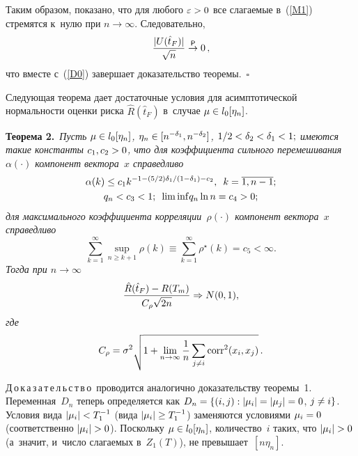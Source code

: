 \begin{multicols}{2}
Таким образом, показано, что для любого $\varepsilon>0$ все слагаемые в~(\ref{M1}) 
стремятся к~нулю при $n\to\infty$. Следовательно,
$$
\displaystyle\frac{\displaystyle |U(\hat{t}_F)|\mathstrut}{\displaystyle \sqrt{n}\mathstrut}  \overset{\, {\sf P} \, }{\to} 0 \,,
$$
что вместе с~(\ref{D0}) завершает доказательство тео\-ремы.~\hfill$\square$

\smallskip

Следующая теорема дает достаточные условия для асимптотической нормальности 
оценки риска $\hat{R}(\hat{t}_F)$ в~случае $\mu \hm\in l_0[\eta_n]$.

\smallskip

\noindent
\textbf{Теорема 2.}\ 
\textit{Пусть $\mu \hm\in l_0[\eta_n]$, $\eta_n\hm\in[n^{-\delta_1}, n^{-\delta_2}]$, $1/2\hm < 
\delta_2\hm < \delta_1\hm<1;$ имеются такие константы $c_1, c_2\hm>0$, что для 
коэффициента сильного перемешивания $\alpha(\cdot)$ компонент вектора~$x$ 
справедливо} 
\begin{gather*}
\alpha(k) \leq c_1 k^{-1-(5/2)\delta_1/(1\hm-\delta_1)\hm-c_2},\enskip 
k=\overline{1,n-1};\\
 q_n < c_3 < 1;\enskip \mathrm{lim\,inf} q_n \ln n = c_4 > 0;
\end{gather*}
\textit{для максимального коэффициента корреляции~$\rho(\cdot)$ компонент вектора~$x$ 
справедливо}
$$
\sum\limits_{k = 1}^{\infty} \sup\limits_{n\geq k+1} \rho(k) \equiv 
\sum\limits_{k = 1}^{\infty}  \rho^\star (k) = c_5 < \infty. 
$$
\textit{Тогда при $n \to \infty$}
$$
\displaystyle\frac{\displaystyle \hat{R}(\hat{t}_F) - R(T_m)\mathstrut}{\displaystyle C_\rho \sqrt{2n}\mathstrut} \Rightarrow N(0, 1),
$$
\textit{где}
$$
C_\rho = \sigma^2\sqrt{1 +   \lim\limits_{n\to\infty} \displaystyle\frac{\displaystyle 1\mathstrut}{\displaystyle n\mathstrut} 
\sum\limits_{j\neq i} \mathrm{corr}^2 (x_i, x_j)}\,.
$$

\noindent
Д\,о\,к\,а\,з\,а\,т\,е\,л\,ь\,с\,т\,в\,о\  проводится аналогично доказательству теоремы~1. 
Переменная~$D_n$ теперь определяется как $D_n \hm= \{(i,j) : 
|\mu_i|\hm=|\mu_j|=0$, $j\hm\neq i\}$. Условия вида $|\mu_i|\hm<T_1^{-1}$ (вида 
$|\mu_i|\hm\geq T_1^{-1}$) заменяются условиями  $\mu_i\hm=0$ (соответственно 
$|\mu_i|\hm>0$).
Поскольку $\mu \hm\in l_0[\eta_n]$, количество~$i$ таких, что $|\mu_i|\hm>0$ 
(а~значит, и~число слагаемых в~$Z_1(T)$), не превышает~$[n \eta_n]$.


\end{multicols}
